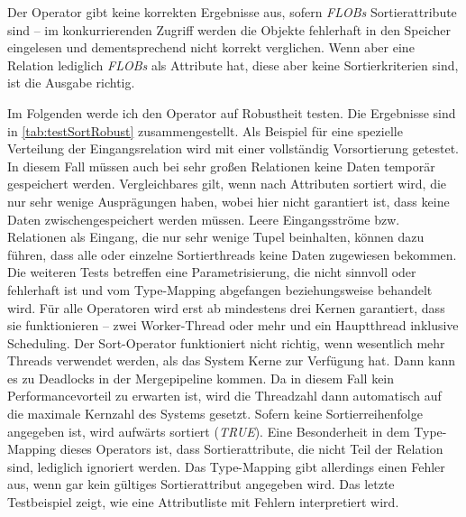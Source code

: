 \documentclass[a4paper,12pt,twoside]{article}
\newcommand{\Fb}[1]{\textit{#1}} %
\begin{document}
Der Operator gibt keine korrekten Ergebnisse aus, sofern \Fb{FLOBs} Sortierattribute sind -- im konkurrierenden Zugriff werden die Objekte fehlerhaft in den Speicher eingelesen und dementsprechend nicht korrekt verglichen. Wenn aber eine Relation lediglich \Fb{FLOBs} als Attribute hat, diese aber keine Sortierkriterien sind, ist die Ausgabe richtig.

Im Folgenden werde ich den Operator auf Robustheit testen. Die Ergebnisse sind in \autoref{tab:testSortRobust} zusammengestellt. Als Beispiel für eine spezielle Verteilung der Eingangsrelation wird mit einer vollständig Vorsortierung getestet. In diesem Fall müssen auch bei sehr großen Relationen keine Daten temporär gespeichert werden. Vergleichbares gilt, wenn nach Attributen sortiert wird, die nur sehr wenige Ausprägungen haben, wobei hier nicht garantiert ist, dass keine Daten zwischengespeichert werden müssen. Leere Eingangsströme bzw. Relationen als Eingang, die nur sehr wenige Tupel beinhalten, können dazu führen, dass alle oder einzelne Sortierthreads keine Daten zugewiesen bekommen. Die weiteren Tests betreffen eine Parametrisierung, die nicht sinnvoll oder fehlerhaft ist und vom Type-Mapping abgefangen beziehungsweise behandelt wird. Für alle Operatoren wird erst ab mindestens drei Kernen garantiert, dass sie funktionieren -- zwei Worker-Thread oder mehr und ein Hauptthread inklusive Scheduling. Der Sort-Operator funktioniert nicht richtig, wenn wesentlich mehr Threads verwendet werden, als das System Kerne zur Verfügung hat. Dann kann es zu Deadlocks in der Mergepipeline kommen. Da in diesem Fall kein Performancevorteil zu erwarten ist, wird die Threadzahl dann automatisch auf die maximale Kernzahl des Systems gesetzt. Sofern keine Sortierreihenfolge angegeben ist, wird aufwärts sortiert (\Fb{TRUE}). Eine Besonderheit in dem Type-Mapping dieses Operators ist, dass Sortierattribute, die nicht Teil der Relation sind, lediglich ignoriert werden. Das Type-Mapping gibt allerdings einen Fehler aus, wenn gar kein gültiges Sortierattribut angegeben wird. Das letzte Testbeispiel zeigt, wie eine Attributliste mit Fehlern interpretiert wird.

\end{document}
